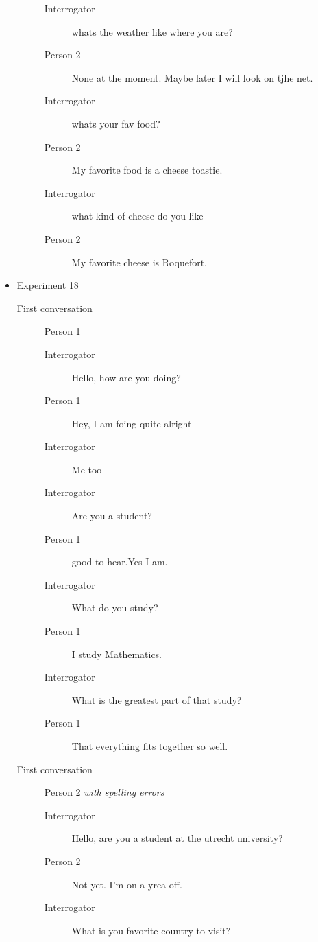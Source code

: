 \begin{itemize}
\begin{description}
\begin{description}
               \item [Interrogator] whats the weather like where you are?\
               \item [Person 2] None at the moment. Maybe later I will look on tjhe net.
               \item [Interrogator] whats your fav food?
               \item [Person 2] My favorite food is a cheese toastie.
               \item [Interrogator] what kind of cheese do you like\
               \item [Person 2] My favorite cheese is Roquefort.
            \end{description}
      \end{description}

   \item Experiment 18
      \begin{description}
         \item [First conversation] Person 1
            \begin{description}
               \item [Interrogator] Hello, how are you doing?
               \item [Person 1] Hey, I am foing quite alright
               \item [Interrogator] Me too
               \item [Interrogator] Are you a student?
               \item [Person 1] good to hear.Yes I am.
               \item [Interrogator] What do you study?
               \item [Person 1] I study Mathematics.
               \item [Interrogator] What is the greatest part of that study?
               \item [Person 1] That everything fits together so well.
            \end{description}
         \item [First conversation] Person 2 \textit{with spelling errors}
            \begin{description}
               \item [Interrogator] Hello, are you a student at the utrecht university?
               \item [Person 2] Not yet. I'm on a yrea off.
               \item [Interrogator] What is you favorite country to visit?

\end{description}
\end{description}
\end{itemize}

